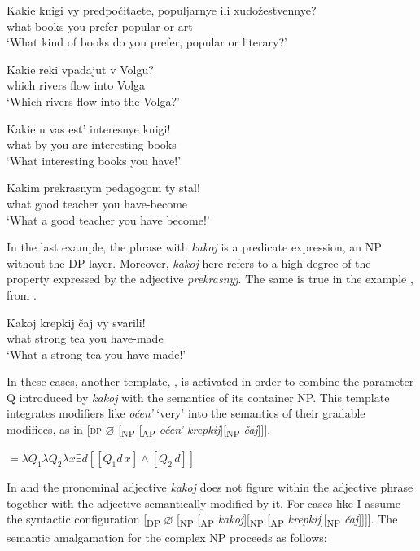 \documentclass[output=paper,colorlinks,citecolor=brown]{langscibook}
\begin{document}
\ea \label{ex:zi08:36}
    \gll Kakie knigi vy predpočitaete, populjarnye ili xudožestvennye?\\
    what books you prefer popular or art\\
    \glt `What kind of books do you prefer, popular or literary?'
\z

\ea \label{ex:zi08:37}
    \gll Kakie reki vpadajut v Volgu?\\
    which rivers flow into Volga\\
    \glt `Which rivers flow into the Volga?'
\z

\ea \label{ex:zi08:38}
    \gll Kakie u vas est' interesnye knigi!\\
    what by you are interesting books\\
    \glt `What interesting books you have!'
\z

\ea \label{ex:zi08:39}
    \gll Kakim prekrasnym pedagogom ty stal!\\
    what good teacher you have-become\\
    \glt `What a good teacher you have become!'
\z

\noindent In the last example, the phrase with \textit{kakoj} is a predicate expression, an NP without the DP layer. Moreover, \textit{kakoj} here refers to a high degree of the property expressed by the adjective \textit{prekrasnyj}. The same is true in the example , from \citet{zi08:Zybatow1990}.

\ea \label{ex:zi08:40}
    \gll Kakoj krepkij čaj vy svarili!\\
    what strong tea you have-made\\
    \glt `What a strong tea you have made!'
\z

\noindent In these cases, another template, , is activated in order to combine the parameter Q introduced by \textit{kakoj} with the semantics of its container NP. This template integrates modifiers like \textit{očen'} `very' into the semantics of their gradable modifiees, as in [\textsc{dp} $\varnothing$ [\textsubscript{NP} [\textsubscript{AP} \textit{očen' krepkij}][\textsubscript{NP} \textit{čaj}]]].

\ea \label{ex:zi08:41}  $= \lambda Q_1 \lambda Q_2 \lambda x \exists d [[Q_1 d\, x] \wedge [Q_2\, d]]$
\z

\noindent In  and  the pronominal adjective \textit{kakoj} does not figure within the adjective phrase together with the adjective semantically modified by it. For cases like  I assume the syntactic configuration [\textsubscript{DP} $\varnothing$ [\textsubscript{NP} [\textsubscript{AP} \textit{kakoj}][\textsubscript{NP} [\textsubscript{AP} \textit{krepkij}][\textsubscript{NP} \textit{čaj}]]]]. The semantic amalgamation for the complex NP proceeds as follows:
\end{document}

